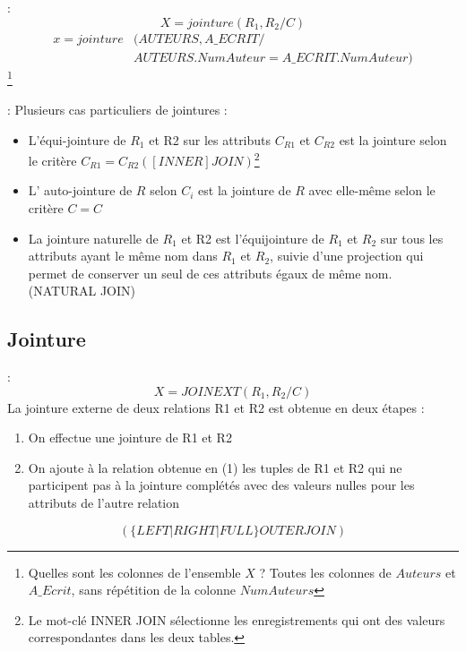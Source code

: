 \documentclass[10pt]{beamer}
\begin{document}
\begin{frame}{\secname : \subsecname}
    $$
        X = jointure(R_1,R_2 / C)
    $$
    \begin{equation}
        \begin{split}
            x = jointure &(AUTEURS, A\_ECRIT  / \\
            & AUTEURS.NumAuteur = A\_ECRIT.NumAuteur)
        \end{split}
    \end{equation}
    \footnote{Quelles sont les colonnes de l'ensemble $X$ ? Toutes les colonnes de $Auteurs$ et $A\_Ecrit$, sans répétition de la colonne $NumAuteurs$}
\end{frame}

\begin{frame}{\secname : \subsecname}
    Plusieurs cas particuliers de jointures :
    \begin{itemize}
        \item L’équi-jointure de $R_1$ et R2 sur les attributs $C_{R1}$ et $C_{R2}$ est la jointure selon le critère $C_{R1} = C_{R2} ([INNER] JOIN)$\footnote{Le mot-clé INNER JOIN sélectionne les enregistrements qui ont des valeurs correspondantes dans les deux tables.}
        \item L’ auto-jointure de $R$ selon $C_i$ est la jointure de $R$ avec elle-même selon le critère $C = C$
        \item La jointure naturelle de $R_1$ et R2 est l’équijointure de $R_1$ et $R_2$ sur tous les attributs ayant le même nom dans $R_1$ et $R_2$, suivie d’une projection qui permet de conserver un seul de ces attributs égaux de même nom. (NATURAL JOIN)
    \end{itemize}

\end{frame}

\subsection{Jointure}
\begin{frame}{\secname : \subsecname}
    $$
        X = JOIN EXT(R_1,R_2 / C)
    $$
    La jointure externe de deux relations R1 et R2 est obtenue en deux étapes :

    \begin{enumerate}
        \item On effectue une jointure de R1 et R2
        \item On ajoute à la relation obtenue en (1) les tuples de R1 et R2 qui ne participent pas à la jointure complétés avec des valeurs nulles pour les attributs de l’autre relation
    \end{enumerate}
    $$
        ( \{ LEFT | RIGHT | FULL \} OUTER JOIN )
    $$
\end{frame}
\end{document}

